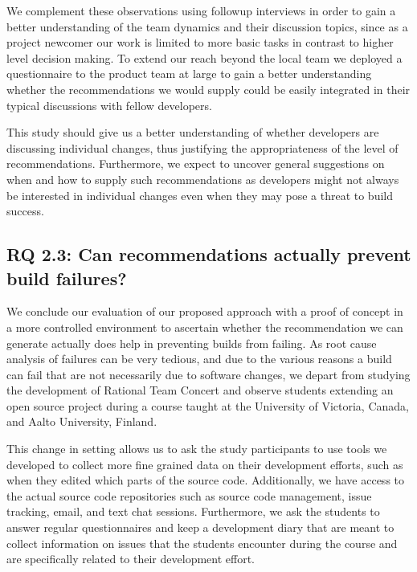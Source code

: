 We complement these observations using followup interviews in order to gain a better understanding of the team dynamics and their discussion topics, since as a project newcomer our work is limited to more basic tasks in contrast to higher level decision making.
To extend our reach beyond the local team we deployed a questionnaire to the product team at large to gain a better understanding whether the recommendations we would supply could be easily integrated in their typical discussions with fellow developers.

This study should give us a better understanding of whether developers are discussing individual changes, thus justifying the appropriateness of the level of recommendations.
Furthermore, we expect to uncover general suggestions on when and how to supply such recommendations as developers might not always be interested in individual changes even when they may pose a threat to build success.

\vspace{-5pt}
\subsection{%
  RQ 2.3: Can recommendations actually prevent build failures?}
\vspace{-7pt}
We conclude our evaluation of our proposed approach with  a proof of concept in a more controlled environment to ascertain whether the recommendation we can generate actually does help in preventing builds from failing.
As root cause analysis of failures can be very tedious, and due to the various reasons a build can fail that are not necessarily due to software changes, we depart from studying the development of Rational Team Concert and observe students extending an open source project during a course taught at the University of Victoria, Canada, and Aalto University, Finland.

This change in setting allows us to ask the study participants to use tools we developed to collect more fine grained data on their development efforts, such as when they edited which parts of the source code.
Additionally, we have access to the actual source code repositories such as source code management, issue tracking, email, and text chat sessions.
Furthermore, we ask the students to answer regular questionnaires and keep a development diary that are meant to collect information on issues that the students encounter during the course and are specifically related to their development effort.

